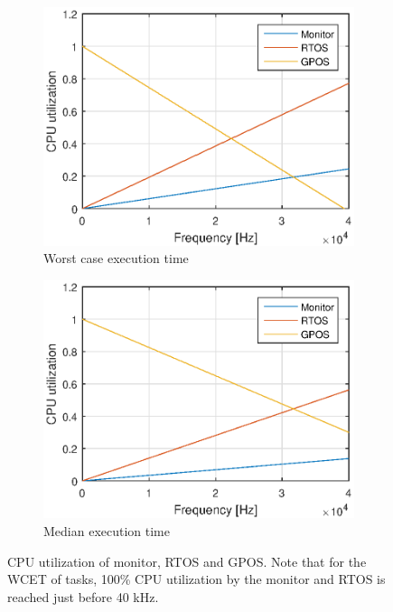 \begin{figure}[H]
\centering
\begin{subfigure}[b]{0.49\textwidth}
\includegraphics[width=\textwidth]{./img/discussion_util_wcet.eps}
\caption{Worst case execution time}
\end{subfigure}
\begin{subfigure}[b]{0.49\textwidth}
\includegraphics[width=\textwidth]{./img/discussion_util_med.eps}
\caption{Median execution time}
\end{subfigure}
\caption{CPU utilization of monitor, RTOS and GPOS. Note that for the WCET of tasks, 100\% CPU utilization by the monitor and RTOS is reached just before 40 kHz.}
\label{fig:cpu_util}
\end{figure}

